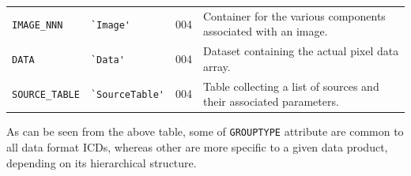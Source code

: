 \documentclass[a4paper,10pt,bibtotoc]{scrartcl}
\begin{document}
\begin{center}
\begin{supertabular}{llp{3cm}p{5.5cm}}
    \hline
    \verb|IMAGE_NNN|        & \verb|`Image'|
                            & \small 004
                            & Container for the various components
                            associated with an image. \\
    \verb|DATA|             & \verb|`Data'|
                            & \small 004	
                            & Dataset containing the actual pixel data array. \\
    \verb|SOURCE_TABLE|     & \verb|`SourceTable'| 
                            & \small 004
                            & Table collecting a list of sources and
                            their associated parameters. \\
  \end{supertabular}
\end{center}

As can be seen from the above table, some of \verb|GROUPTYPE|
attribute are common to all data format ICDs, whereas other are more
specific to a given data product, depending on its hierarchical structure.


\section*{\glossaryname}
\label{sec:glossary}






\end{document}
